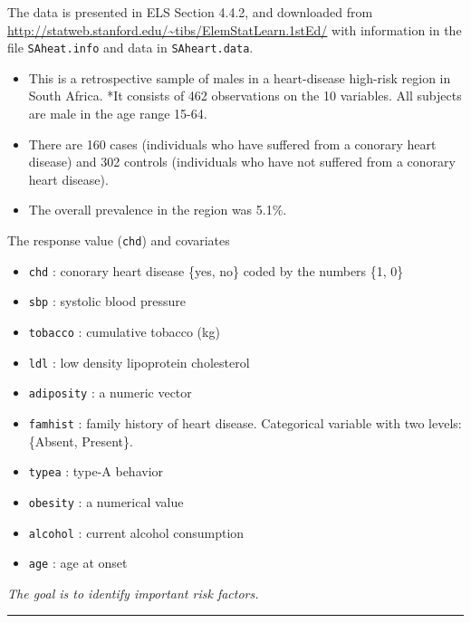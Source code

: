 \documentclass[
  letterpaper,
  DIV=11,
  numbers=noendperiod]{scrartcl}
\providecommand{\tightlist}{%
  \setlength{\itemsep}{0pt}\setlength{\parskip}{0pt}}\usepackage{longtable,booktabs,array}
\begin{document}
The data is presented in ELS Section 4.4.2, and downloaded from
\url{http://statweb.stanford.edu/~tibs/ElemStatLearn.1stEd/} with
information in the file \texttt{SAheat.info} and data in
\texttt{SAheart.data}.

\begin{itemize}
\tightlist
\item
  This is a retrospective sample of males in a heart-disease high-risk
  region in South Africa. *It consists of 462 observations on the 10
  variables. All subjects are male in the age range 15-64.
\item
  There are 160 cases (individuals who have suffered from a conorary
  heart disease) and 302 controls (individuals who have not suffered
  from a conorary heart disease).\\
\item
  The overall prevalence in the region was 5.1\%.
\end{itemize}

The response value (\texttt{chd}) and covariates

\begin{itemize}
\tightlist
\item
  \texttt{chd} : conorary heart disease \{yes, no\} coded by the numbers
  \{1, 0\}
\item
  \texttt{sbp} : systolic blood pressure\\
\item
  \texttt{tobacco} : cumulative tobacco (kg)\\
\item
  \texttt{ldl} : low density lipoprotein cholesterol
\item
  \texttt{adiposity} : a numeric vector
\item
  \texttt{famhist} : family history of heart disease. Categorical
  variable with two levels: \{Absent, Present\}.
\item
  \texttt{typea} : type-A behavior
\item
  \texttt{obesity} : a numerical value
\item
  \texttt{alcohol} : current alcohol consumption
\item
  \texttt{age} : age at onset
\end{itemize}

\emph{The goal is to identify important risk factors.}

\begin{center}\rule{0.5\linewidth}{0.5pt}\end{center}
\end{document}
